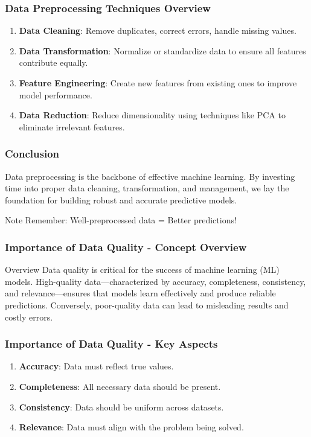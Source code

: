 \documentclass[aspectratio=169]{beamer}
\begin{document}
\begin{frame}[fragile]
    \frametitle{Data Preprocessing Techniques Overview}
    \begin{enumerate}
        \item \textbf{Data Cleaning}: Remove duplicates, correct errors, handle missing values.
        \item \textbf{Data Transformation}: Normalize or standardize data to ensure all features contribute equally.
        \item \textbf{Feature Engineering}: Create new features from existing ones to improve model performance.
        \item \textbf{Data Reduction}: Reduce dimensionality using techniques like PCA to eliminate irrelevant features.
    \end{enumerate}
\end{frame}

\begin{frame}[fragile]
    \frametitle{Conclusion}
    Data preprocessing is the backbone of effective machine learning. By investing time into proper data cleaning, transformation, and management, we lay the foundation for building robust and accurate predictive models.
    \begin{block}{Note}
        Remember: Well-preprocessed data = Better predictions!
    \end{block}
\end{frame}

\begin{frame}[fragile]
    \frametitle{Importance of Data Quality - Concept Overview}
    \begin{block}{Overview}
        Data quality is critical for the success of machine learning (ML) models. High-quality data—characterized by accuracy, completeness, consistency, and relevance—ensures that models learn effectively and produce reliable predictions. Conversely, poor-quality data can lead to misleading results and costly errors.
    \end{block}
\end{frame}

\begin{frame}[fragile]
    \frametitle{Importance of Data Quality - Key Aspects}
    \begin{enumerate}
        \item \textbf{Accuracy}: Data must reflect true values.
        \item \textbf{Completeness}: All necessary data should be present.
        \item \textbf{Consistency}: Data should be uniform across datasets.
        \item \textbf{Relevance}: Data must align with the problem being solved.
    \end{enumerate}
\end{frame}
\end{document}
